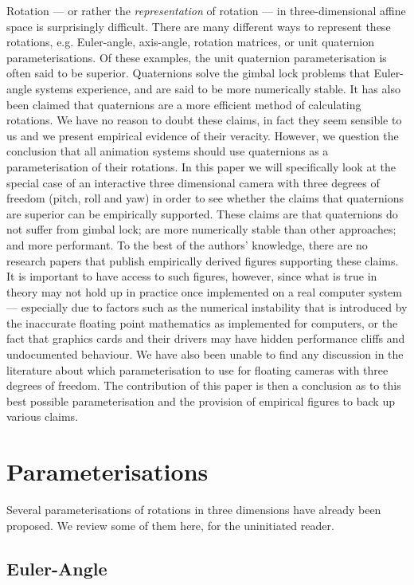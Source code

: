 \documentclass{acm_proc_article-sp}
\begin{document}
Rotation --- or rather the \emph{representation} of rotation --- in three-dimensional affine space is surprisingly difficult.
There are many different ways to represent these rotations, e.g. Euler-angle, axis-angle, rotation matrices, or unit quaternion parameterisations.
Of these examples, the unit quaternion parameterisation is often said to be superior.
Quaternions solve the gimbal lock problems that Euler-angle systems experience, and are said to be more numerically stable.
It has also been claimed that quaternions are a more efficient method of calculating rotations.
We have no reason to doubt these claims, in fact they seem sensible to us and we present empirical evidence of their veracity.
However, we question the conclusion that all animation systems should use quaternions as a parameterisation of their rotations.
In this paper we will specifically look at the special case of an interactive three dimensional camera with three degrees of freedom (pitch, roll and yaw) in order to see whether the claims that quaternions are superior can be empirically supported.
These claims are that quaternions do not suffer from gimbal lock; are more numerically stable than other approaches; and more performant.
To the best of the authors' knowledge, there are no research papers that publish empirically derived figures supporting these claims.
It is important to have access to such figures, however, since what is true in theory may not hold up in practice once implemented on a real computer system ---
especially due to factors such as the numerical instability that is introduced by the inaccurate floating point mathematics as implemented for computers, or the fact that graphics cards and their drivers may have hidden performance cliffs and undocumented behaviour.
We have also been unable to find any discussion in the literature about which parameterisation to use for floating cameras with three degrees of freedom.
The contribution of this paper is then a conclusion as to this best possible parameterisation and the provision of empirical figures to back up various claims.

\section{Parameterisations}

Several parameterisations of rotations in three dimensions have already been proposed.
We review some of them here, for the uninitiated reader.

\subsection{Euler-Angle}
\end{document}

